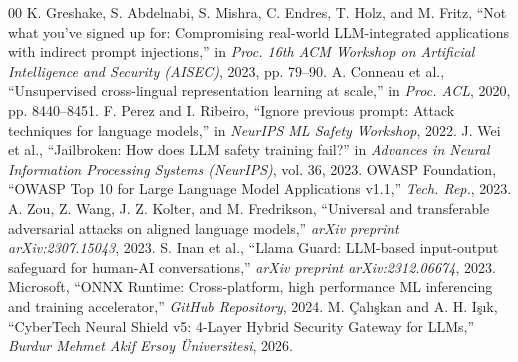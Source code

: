\documentclass[conference]{IEEEtran}
\begin{document}
\begin{thebibliography}{00}
 K. Greshake, S. Abdelnabi, S. Mishra, C. Endres, T. Holz, and M. Fritz, ``Not what you've signed up for: Compromising real-world LLM-integrated applications with indirect prompt injections,'' in \textit{Proc. 16th ACM Workshop on Artificial Intelligence and Security (AISEC)}, 2023, pp. 79--90.
 A. Conneau et al., ``Unsupervised cross-lingual representation learning at scale,'' in \textit{Proc. ACL}, 2020, pp. 8440--8451.
 F. Perez and I. Ribeiro, ``Ignore previous prompt: Attack techniques for language models,'' in \textit{NeurIPS ML Safety Workshop}, 2022.
 J. Wei et al., ``Jailbroken: How does LLM safety training fail?'' in \textit{Advances in Neural Information Processing Systems (NeurIPS)}, vol. 36, 2023.
 OWASP Foundation, ``OWASP Top 10 for Large Language Model Applications v1.1,'' \textit{Tech. Rep.}, 2023.
 A. Zou, Z. Wang, J. Z. Kolter, and M. Fredrikson, ``Universal and transferable adversarial attacks on aligned language models,'' \textit{arXiv preprint arXiv:2307.15043}, 2023.
 S. Inan et al., ``Llama Guard: LLM-based input-output safeguard for human-AI conversations,'' \textit{arXiv preprint arXiv:2312.06674}, 2023.
 Microsoft, ``ONNX Runtime: Cross-platform, high performance ML inferencing and training accelerator,'' \textit{GitHub Repository}, 2024.
 M. Çalışkan and A. H. Işık, ``CyberTech Neural Shield v5: 4-Layer Hybrid Security Gateway for LLMs,'' \textit{Burdur Mehmet Akif Ersoy Üniversitesi}, 2026.
\end{thebibliography}
\end{document}
